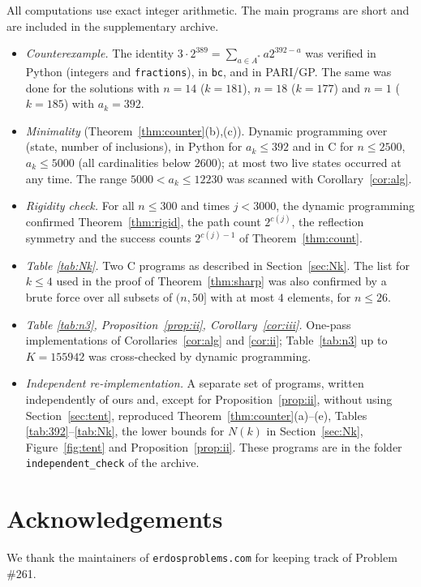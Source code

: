 \documentclass[11pt]{amsart}
\theoremstyle{definition}
\theoremstyle{remark}
\begin{document}
All computations use exact integer arithmetic. The main programs are short and are included in the supplementary archive.
\begin{itemize}[leftmargin=*]
\item \emph{Counterexample.} The identity $3\cdot2^{389}=\sum_{a\in A^*}a2^{392-a}$ was verified in Python (integers and \texttt{fractions}), in \texttt{bc}, and in PARI/GP. The same was done for the solutions with $n=14$ ($k=181$), $n=18$ ($k=177$) and $n=1$ ($k=185$) with $a_k=392$.
\item \emph{Minimality} (Theorem~\ref{thm:counter}(b),(c)). Dynamic programming over (state, number of inclusions), in Python for $a_k\le392$ and in C for $n\le2500$, $a_k\le5000$ (all cardinalities below $2600$); at most two live states occurred at any time. The range $5000<a_k\le 12230$ was scanned with Corollary~\ref{cor:alg}.
\item \emph{Rigidity check.} For all $n\le300$ and times $j<3000$, the dynamic programming confirmed Theorem~\ref{thm:rigid}, the path count $2^{c(j)}$, the reflection symmetry and the success counts $2^{c(j)-1}$ of Theorem~\ref{thm:count}.
\item \emph{Table \ref{tab:Nk}.} Two C programs as described in Section~\ref{sec:Nk}. The list for $k\le4$ used in the proof of Theorem~\ref{thm:sharp} was also confirmed by a brute force over all subsets of $(n,50]$ with at most $4$ elements, for $n\le26$.
\item \emph{Table \ref{tab:n3}, Proposition~\ref{prop:ii}, Corollary~\ref{cor:iii}.} One-pass implementations of Corollaries~\ref{cor:alg} and \ref{cor:ii}; Table~\ref{tab:n3} up to $K=155942$ was cross-checked by dynamic programming.
\item \emph{Independent re-implementation.} A separate set of programs, written independently of ours and, except for Proposition~\ref{prop:ii}, without using Section~\ref{sec:tent}, reproduced Theorem~\ref{thm:counter}(a)--(e), Tables \ref{tab:392}--\ref{tab:Nk}, the lower bounds for $N(k)$ in Section~\ref{sec:Nk}, Figure~\ref{fig:tent} and Proposition~\ref{prop:ii}. These programs are in the folder \texttt{independent\_check} of the archive.
\end{itemize}

\section*{Acknowledgements}
We thank the maintainers of \texttt{erdosproblems.com} for keeping track of Problem \#261.
\end{document}
